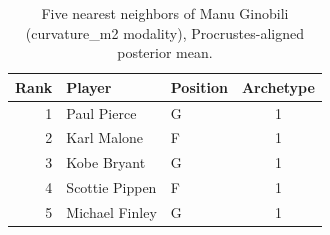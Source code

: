 \begin{table}[htbp]
  \centering\small
  \begin{tabular}{rllc}
    \toprule
    Rank & Player & Position & Archetype \\
    \midrule
    1 & Paul Pierce & G & 1 \\
    2 & Karl Malone & F & 1 \\
    3 & Kobe Bryant & G & 1 \\
    4 & Scottie Pippen & F & 1 \\
    5 & Michael Finley & G & 1 \\
    \bottomrule
  \end{tabular}
  \caption{Five nearest neighbors of Manu Ginobili (curvature_m2 modality), Procrustes-aligned posterior mean.}
  \label{tab:Manu_Ginobili_neighbors_curvature_m2}
\end{table}

